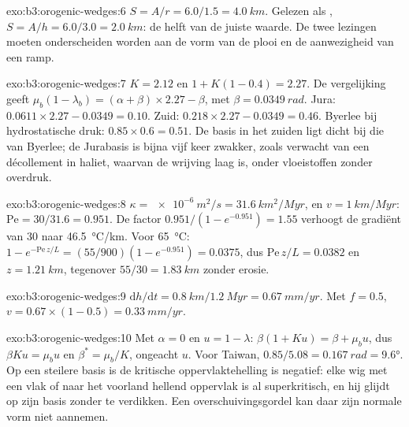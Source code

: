 \begin{solution}{exo:b3:orogenic-wedges:6}
$S = A/r = 6.0/1.5 = \qty{4.0}{km}$. Gelezen als , $S = A/h =
6.0/3.0 = \qty{2.0}{km}$: de helft van de juiste waarde. De twee lezingen moeten
onderscheiden worden aan de vorm van de plooi en de aanwezigheid van een ramp.
\end{solution}

\begin{solution}{exo:b3:orogenic-wedges:7}
$K = 2.12$ en $1 + K(1 - 0.4) = 2.27$. De vergelijking geeft $\mu_b(1 -
\lambda_b) = (\alpha + \beta)\times2.27 - \beta$, met $\beta =
\qty{0.0349}{rad}$. Jura: $0.0611\times2.27 - 0.0349 = 0.10$. Zuid:
$0.218\times2.27 - 0.0349 = 0.46$. Byerlee bij hydrostatische druk:
$0.85\times0.6 = 0.51$. De basis in het zuiden ligt dicht bij die van Byerlee; de
Jurabasis is bijna vijf keer zwakker, zoals verwacht van een décollement in
haliet, waarvan de wrijving laag is, onder vloeistoffen zonder overdruk.
\end{solution}

\begin{solution}{exo:b3:orogenic-wedges:8}
$\kappa = \qty{e-6}{m^2/s} = \qty{31.6}{km^2/Myr}$, en $v =
\qty{1}{km/Myr}$: $\mathrm{Pe} = 30/31.6 = 0.951$. De factor $0.951/(1 -
e^{-0.951}) = 1.55$ verhoogt de gradiënt van 30 naar \qty{46.5}{\celsius/km}.
Voor \qty{65}{\celsius}: $1 - e^{-\mathrm{Pe}\,z/L} = (55/900)(1 - e^{-0.951})
= 0.0375$, dus $\mathrm{Pe}\,z/L = 0.0382$ en $z = \qty{1.21}{km}$, tegenover
$55/30 = \qty{1.83}{km}$ zonder erosie.
\end{solution}

\begin{solution}{exo:b3:orogenic-wedges:9}
$\mathrm dh/\mathrm dt = \qty{0.8}{km}/\qty{1.2}{Myr} = \qty{0.67}{mm/yr}$.
Met $f = 0.5$, $v = 0.67\times(1 - 0.5) = \qty{0.33}{mm/yr}$.
\end{solution}

\begin{solution}{exo:b3:orogenic-wedges:10}
Met $\alpha = 0$ en $u = 1 - \lambda$: $\beta(1 + Ku) = \beta + \mu_b u$,
dus $\beta Ku = \mu_b u$ en $\beta^* = \mu_b/K$, ongeacht $u$. Voor Taiwan,
$0.85/5.08 = \qty{0.167}{rad} = \ang{9.6}$. Op een steilere basis is de kritische
oppervlaktehelling is negatief: elke wig met een vlak of naar het voorland hellend
oppervlak is al superkritisch, en hij glijdt op zijn basis zonder te verdikken. Een
overschuivingsgordel kan daar zijn normale vorm niet aannemen.
\end{solution}


